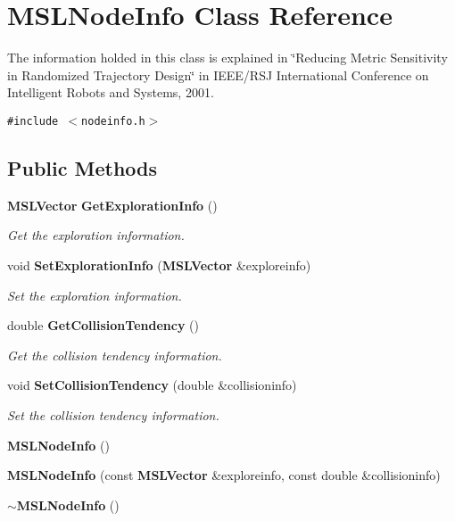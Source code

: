 \section{MSLNode\-Info  Class Reference}
\label{classMSLNodeInfo}
The information holded in this class is explained in \char`\"{}Reducing Metric Sensitivity in Randomized Trajectory Design\char`\"{} in IEEE/RSJ International Conference on Intelligent Robots and Systems, 2001. 


{\tt \#include $<$nodeinfo.h$>$}

\subsection*{Public Methods}
\begin{CompactItemize}
\item 
{\bf MSLVector} {\bf Get\-Exploration\-Info} ()
\begin{CompactList}\small\item\em Get the exploration information.\item\end{CompactList}\item 
void {\bf Set\-Exploration\-Info} ({\bf MSLVector} \&exploreinfo)
\begin{CompactList}\small\item\em Set the exploration information.\item\end{CompactList}\item 
double {\bf Get\-Collision\-Tendency} ()
\begin{CompactList}\small\item\em Get the collision tendency information.\item\end{CompactList}\item 
void {\bf Set\-Collision\-Tendency} (double \&collisioninfo)
\begin{CompactList}\small\item\em Set the collision tendency information.\item\end{CompactList}\item 
{\bf MSLNode\-Info} ()
\item 
{\bf MSLNode\-Info} (const {\bf MSLVector} \&exploreinfo, const double \&collisioninfo)
\item 
{\bf $\sim$MSLNode\-Info} ()
\end{CompactItemize}


